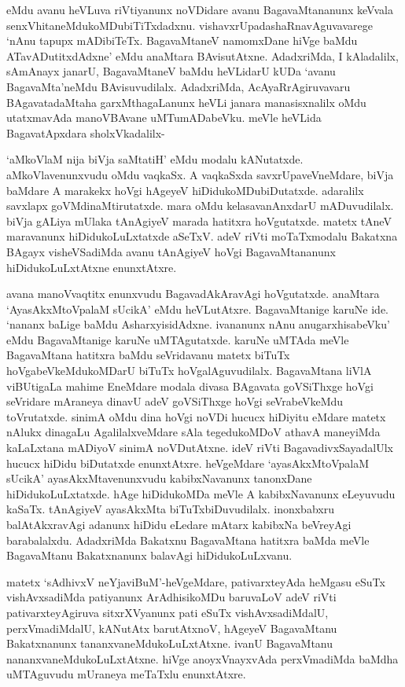 \noindent eMdu avanu heVLuva riVtiyanunx noVDidare avanu BagavaMtananunx keVvala 
senxVhitaneMdukoMDubiTiTxdadxnu. vishavxrUpadashaRnavAguvavarege `nAnu tapupx mADibiTeTx. BagavaMtaneV namomxDane hiVge baMdu ATavADutitxdAdxne' eMdu anaMtara BAvisutAtxne. AdadxriMda, I kAladalilx, sAmAnayx janarU, BagavaMtaneV baMdu heVLidarU kUDa `avanu BagavaMta'neMdu BAvisuvudilalx. AdadxriMda, AcAyaRrAgiruvavaru BAgavatadaMtaha garxMthagaLanunx heVLi janara manasisxnalilx oMdu utatxmavAda manoVBAvane uMTumADabeVku. meVle heVLida BagavatApxdara sholxVkadalilx-

`aMkoVlaM nija biVja saMtatiH' eMdu modalu kANutatxde. aMkoVlavenunxvudu oMdu vaqkaSx. A vaqkaSxda savxrUpaveVneMdare, biVja baMdare A marakekx hoVgi hAgeyeV 
hiDidukoMDubiDutatxde. adaralilx savxlapx goVMdinaMtirutatxde. mara oMdu kelasavanAnxdarU mADuvudilalx. biVja gALiya mUlaka tAnAgiyeV 
marada hatitxra hoVgutatxde. matetx tAneV maravanunx hiDidukoLuLxtatxde aSeTxV. adeV riVti moTaTxmodalu Bakatxna BAgayx visheVSadiMda avanu tAnAgiyeV hoVgi BagavaMtananunx hiDidukoLuLxtAtxne enunxtAtxre. 

avana manoVvaqtitx enunxvudu BagavadAkAravAgi hoVgutatxde. anaMtara `AyasAkxMtoVpalaM sUcikA' eMdu heVLutAtxre. BagavaMtanige karuNe ide. `nananx baLige baMdu AsharxyisidAdxne. ivananunx nAnu anugarxhisabeVku' eMdu BagavaMtanige karuNe uMTAgutatxde. karuNe uMTAda meVle BagavaMtana hatitxra baMdu seVridavanu matetx biTuTx hoVgabeVkeMdukoMDarU biTuTx hoVgalAguvudilalx. BagavaMtana liVlA viBUtigaLa mahime EneMdare modala divasa BAgavata goVSiThxge hoVgi seVridare mAraneya dinavU adeV goVSiThxge hoVgi seVrabeVkeMdu toVrutatxde. sinimA oMdu dina hoVgi noVDi hucucx hiDiyitu eMdare matetx nAlukx dinagaLu AgalilalxveMdare sAla tegedukoMDoV athavA maneyiMda kaLaLxtana mADiyoV sinimA noVDutAtxne. ideV riVti BagavadivxSayadalUlx hucucx hiDidu biDutatxde enunxtAtxre. heVgeMdare `ayasAkxMtoVpalaM sUcikA' ayasAkxMtavenunxvudu kabibxNavanunx tanonxDane hiDidukoLuLxtatxde. hAge hiDidukoMDa meVle A kabibxNavanunx eLeyuvudu kaSaTx. tAnAgiyeV ayasAkxMta biTuTxbiDuvudilalx. inonxbabxru balAtAkxravAgi adanunx hiDidu eLedare mAtarx kabibxNa beVreyAgi barabalalxdu. AdadxriMda Bakatxnu BagavaMtana hatitxra baMda meVle BagavaMtanu Bakatxnanunx balavAgi hiDidukoLuLxvanu. 

matetx `sAdhivxV neYjaviBuM'-heVgeMdare, pativarxteyAda heMgasu eSuTx vishAvxsadiMda patiyanunx ArAdhisikoMDu baruvaLoV adeV riVti pativarxteyAgiruva sitxrXVyanunx pati eSuTx vishAvxsadiMdalU, perxVmadiMdalU, kANutAtx barutAtxnoV, hAgeyeV BagavaMtanu Bakatxnanunx tananxvaneMdukoLuLxtAtxne. ivanU BagavaMtanu nananxvaneMdukoLuLxtAtxne. hiVge anoyxVnayxvAda perxVmadiMda baMdha uMTAguvudu mUraneya meTaTxlu enunxtAtxre.

